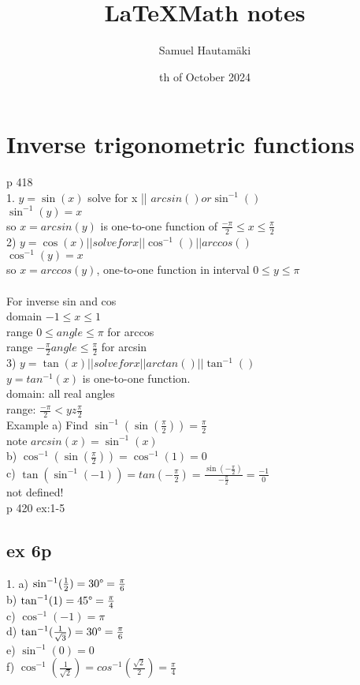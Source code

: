 \documentclass{article}
\title{\LaTeX Math notes}
\author{Samuel Hautamäki}
\date{th of October 2024}
\begin{document}
  \maketitle
   
  \section{Inverse trigonometric functions}
  p 418\\
  1. $y=\sin(x)$ solve for x || $arcsin() or \sin^{-1}()$\\
  $\sin^{-1}(y)=x$\\
  so $x=arcsin(y)$ is one-to-one function of $\frac{-\pi}{2}\leq x\leq \frac{\pi}{2}$\\
  2) $y=\cos(x) || solve for x || \cos^{-1}() || arccos()$\\
  $\cos^{-1}(y)=x$\\
  so $x=arccos(y)$, one-to-one function in interval $0\leq y\leq\pi$\\
  \\
  For inverse sin and cos\\
  domain $-1\leq x\leq1$\\
  range $0\leq angle\leq\pi$ for arccos\\
  range $-\frac{\pi}{2} angle \leq \frac{\pi}{2}$ for arcsin\\
  3) $y=\tan(x) || solve for x || arctan() || \tan^{-1}()$\\
  $y=tan^{-1}(x)$ is one-to-one function.\\
  domain: all real angles\\
  range: $\frac{-\pi}{2}<yz\frac{\pi}{2}$\\
  Example a) Find $\sin^{-1}(\sin(\frac{\pi}{2}))=\frac{\pi}{2}$\\
  note $arcsin(x)=\sin^{-1}(x)$\\
  b) $\cos^{-1}(\sin(\frac{\pi}{2}))=\cos^{-1}(1)=0$\\
  c) $\tan(\sin^{-1}(-1))=tan(-\frac{\pi}{2})=\frac{\sin(-\frac{\pi}{2})}{-\frac{\pi}{2}}=\frac{-1}{0}$\\
  not defined!\\
  p 420 ex:1-5\\
  \subsection{ex 6p}
  1. a) $\sin^{-1}(\frac{1}{2})=30\degree=\frac{\pi}{6}$\\
  b) $\tan^{-1}(1)=45\degree=\frac{\pi}{4}$\\
  c) $\cos^{-1}(-1)=\pi$\\
  d) $\tan^{-1}(\frac{1}{\sqrt{3}})=30\degree=\frac{\pi}{6}$\\
  e) $\sin^{-1}(0)=0$\\
  f) $\cos^{-1}(\frac{1}{\sqrt{2}})=cos^{-1}(\frac{\sqrt{2}}{2})=\frac{\pi}{4}$\\
  


   
\end{document}
